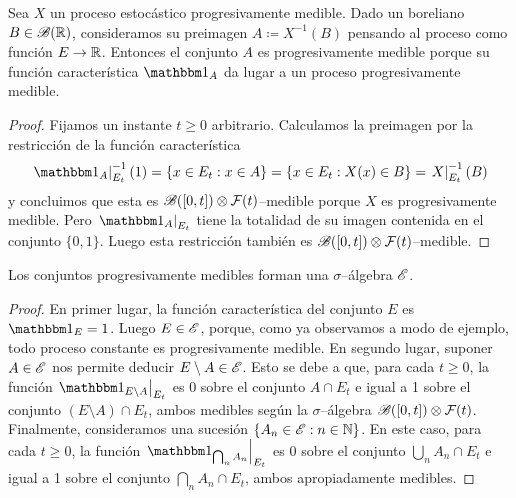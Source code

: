 \begin{example}
  \label{example:progressivelyMeasurablePreimage}
  Sea \(X\) un proceso estocástico progresivamente medible.
  Dado un boreliano \(B \in \mathscr{B}(\mathbb{R})\), consideramos su preimagen \(A \coloneqq X^{- 1}(B)\) pensando al proceso como función \(E \rightarrow \mathbb{R}\).
  Entonces el conjunto \(A\) es progresivamente medible porque su función característica \(\characteristic_A\) da lugar a un proceso progresivamente medible.
\end{example}
\begin{proof}
  Fijamos un instante \(t \geq 0\) arbitrario.
  Calculamos la preimagen por la restricción de la función característica
  \begin{align}
    \restrict{\characteristic_A}{E_t}^{- 1} (1)
    =
      \{x \in E_t : x \in A\}
    =
      \{x \in E_t : X(x) \in B\}
    =
      \restrict{X}{E_t}^{- 1}(B)
  \end{align}
  y concluimos que esta es \(\mathscr{B}([0, t]) \otimes \mathcal{F}(t)\)--medible porque \(X\) es progresivamente medible.
  Pero \(\restrict{\characteristic_A}{E_t}\) tiene la totalidad de su imagen contenida en el conjunto \(\{0, 1\}\).
  Luego esta restricción también es \(\mathscr{B}([0, t]) \otimes \mathcal{F}(t)\)--medible.
\end{proof}


\begin{theorem}
  Los conjuntos progresivamente medibles forman una \(\sigma\)--álgebra \(\mathscr{E}\).
\end{theorem}
\begin{proof}
  En primer lugar, la función característica del conjunto \(E\) es \({\characteristic_E = 1}\).
  Luego \(E \in \mathscr{E}\), porque, como ya observamos a modo de ejemplo, todo proceso constante es progresivamente medible.
  En segundo lugar, suponer \(A \in \mathscr{E}\) nos permite deducir \(E \setminus A \in \mathscr{E}\).
  Esto se debe a que, para cada \(t \geq 0\), la función \(\restrict{\characteristic_{E \setminus A}}{E_t}\) es 0 sobre el conjunto \(A \cap E_t\) e igual a 1 sobre el conjunto \((E \setminus A) \cap E_t\), ambos medibles según la \(\sigma\)--álgebra \(\mathscr{B}([0, t]) \otimes \mathcal{F}(t)\).
  Finalmente, consideramos una sucesión \(\{A_n \in \mathscr{E} : n \in \mathbb{N}\}\).
  En este caso, para cada \(t \geq 0\), la función \(\restrict{\characteristic_{\bigcap_n A_n}}{E_t}\)
  es 0 sobre el conjunto \(\bigcup_n A_n \cap E_t\) e igual a 1 sobre el conjunto \(\bigcap_n A_n \cap E_t\), ambos apropiadamente medibles.
\end{proof}


